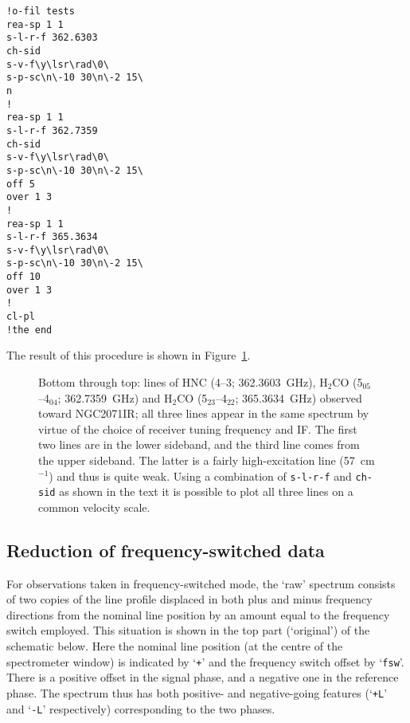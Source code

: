 \begin{verbatim}
!o-fil tests
rea-sp 1 1
s-l-r-f 362.6303
ch-sid
s-v-f\y\lsr\rad\0\
s-p-sc\n\-10 30\n\-2 15\
n
!
rea-sp 1 1
s-l-r-f 362.7359
ch-sid
s-v-f\y\lsr\rad\0\
s-p-sc\n\-10 30\n\-2 15\
off 5
over 1 3
!
rea-sp 1 1
s-l-r-f 365.3634
s-v-f\y\lsr\rad\0\
s-p-sc\n\-10 30\n\-2 15\
off 10
over 1 3
!
cl-pl
!the end
\end{verbatim}

The result of this procedure is shown in Figure~\ref{fig:s-l-r-f}. 

\begin{figure}[htb]
\centering
\leavevmode
\epsfysize=3.0in
\rotate[r]{\epsffile[0 0 495 765]{sc8_s-l-r-f.ps}}
\vspace*{-0.5cm}
\begin{center}
\begin{minipage}[t]{5.5in}
\caption[Using s-l-r-f etc] 
{\small{Bottom through top: lines of HNC (4--3; 362.3603~GHz), H$_2$CO
(5$_{05}$--4$_{04}$; 362.7359~GHz) and H$_2$CO (5$_{23}$--4$_{22}$;
365.3634~GHz) observed toward NGC2071IR; all three lines appear in the
same spectrum by virtue of the choice of receiver tuning frequency and
IF. The first two lines are in the lower sideband, and the
third line comes from the upper sideband. The latter is a fairly
high-excitation line (57~cm$^{-1}$) and thus is quite weak. Using a
combination of {\tt s-l-r-f} and {\tt ch-sid} as shown in the text it
is possible to plot all three lines on a common velocity scale.
}}
\label{fig:s-l-r-f}
\end{minipage}
\end{center}
\end{figure}



\subsection{Reduction of frequency-switched data}
\label{sec:fsw-reduction}

For observations taken in frequency-switched mode, the `raw' spectrum
consists of two copies of the line profile displaced in both plus and
minus frequency directions from the nominal line position by an amount
equal to the frequency switch employed. This situation is shown in the
top part (`original') of the schematic below. Here the nominal line
position (at the centre of the spectrometer window) is indicated by
`{\tt{+}}' and the frequency switch offset by `{\tt{fsw}}'. There is a
positive offset in the signal phase, and a negative one in the
reference phase. The spectrum thus has both positive- and
negative-going features (`{\tt{+L}}' and `{\tt{-L}}' respectively)
corresponding to the two phases.

